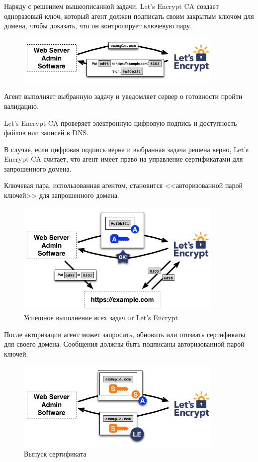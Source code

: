 \documentclass[10pt, a5paper]{article}
\begin{document}
Наряду с решением вышеописанной задачи, Let’s Encrypt CA  создает одноразовый ключ, который агент должен подписать своим закрытым ключом для домена, чтобы доказать, что он контролирует ключевую пару.

\begin{figure}[h!]
  \centering
  \includegraphics[width=10cm]{w_03_2016_Kharkevich7.png}
  
\end{figure}

Агент выполняет выбранную задачу и уведомляет сервер о готовности пройти валидацию.

Let’s Encrypt CA проверяет электронную цифровую подпись и доступность файлов или записей в DNS.

В случае, если цифровая подпись верна и выбранная задача решена верно, Let’s Encrypt CA считает, что агент имеет право на управление сертификатами для запрошенного домена.

Ключевая пара, использованная агентом, становится <<авторизованной парой ключей>> для запрошенного домена.

\begin{figure}[h!]
  \centering
  \includegraphics[height=5.5cm]{w_03_2016_Kharkevich8.png}
\caption*{Успешное выполнение всех задач от Let’s Encrypt}\label{fig:Kharkevich8}
\end{figure}


После авторизации агент может запросить, обновить или отозвать сертификаты для своего домена. Сообщения должны быть подписаны авторизованной парой ключей.

\begin{figure}[h!]
  \centering
  \includegraphics[width=10cm]{w_03_2016_Kharkevich9.png}
\caption*{Выпуск сертификата}\label{fig:Kharkevich9}
\end{figure}
\end{document}

